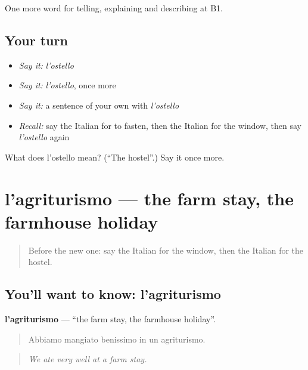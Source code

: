 \begin{grammarlens}[title={What you've built}]
One more word for telling, explaining and describing at B1.
\end{grammarlens}

\subsection*{Your turn}
\begin{itemize}
\raggedright
  \item \emph{Say it:} \emph{l'ostello}
  \item \emph{Say it:} \emph{l'ostello}, once more
  \item \emph{Say it:} a sentence of your own with \emph{l'ostello}
  \item \emph{Recall:} say the Italian for to fasten, then the Italian for the window, then say \emph{l'ostello} again
\end{itemize}

\begin{tcolorbox}[breakable,colback=teal!4,colframe=teal!35!black,title={Before you move on}]
What does l'ostello mean? (\textquotedblleft{}The hostel\textquotedblright{}.) Say it once more.
\end{tcolorbox}
\section[l'agriturismo]{l'agriturismo — the farm stay, the farmhouse holiday}

\label{lesson:IT-C429-agriturismo}



\begin{quote}
Before the new one: say the Italian for the window, then the Italian for the hostel.
\end{quote}

\subsection*{You'll want to know: l'agriturismo}
\textbf{l'agriturismo} — \textquotedblleft{}the farm stay, the farmhouse holiday\textquotedblright{}.

\begin{quote}
Abbiamo mangiato benissimo in un agriturismo.
\end{quote}

\begin{quote}
\emph{We ate very well at a farm stay.}
\end{quote}

